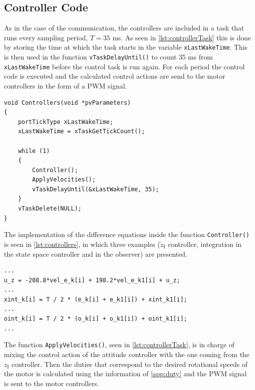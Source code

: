 \subsection{Controller Code}
As in the case of the communication, the controllers are included in a task that runs every sampling period, $T = 35$ \si{ms}. As seen in \autoref{lst:controllerTask} this is done by storing the time at which the task starts in the variable \lstinline[style=customcppinline]{xLastWakeTime}. This is then used in the function \lstinline[style=customcppinline]{vTaskDelayUntil()} to count 35 ms from \lstinline[style=customcppinline]{xLastWakeTime} before the control task is run again. For each period the control code is executed and the calculated control actions are send to the motor controllers in the form of a PWM signal.



\begin{lstlisting}[style=customcpp,
caption={Code for the controller task.}, 
label=lst:controllerTask]
void Controllers(void *pvParameters)
{
	portTickType xLastWakeTime;
	xLastWakeTime = xTaskGetTickCount();
	
	while (1)
	{
		Controller();
		ApplyVelocities();
		vTaskDelayUntil(&xLastWakeTime, 35);
	}
	vTaskDelete(NULL);
}
\end{lstlisting}

The implementation of the difference equations inside the function \lstinline[style=customcppinline]{Controller()} is seen in \autoref{lst:controllers}, in which three examples ($\dot{z}_{\mathrm{I}}$ controller, integration in the state space controller and in the observer) are presented.

\begin{lstlisting}[style=customcpp,
caption={Code for the controllers.}, 
label=lst:controllers]
...
u_z = -208.8*vel_e_k[i] + 198.2*vel_e_k1[i] + u_z;
...
xint_k[i] = T / 2 * (e_k[i] + e_k1[i]) + xint_k1[i];
...
oint_k[i] = T / 2 * (o_k[i] + o_k1[i]) + oint_k1[i];
...

\end{lstlisting}

The function \lstinline[style=customcppinline]{ApplyVelocities()}, seen in \autoref{lst:controllerTask}, is in charge of mixing the control action of the attitude controller with the one coming from the $z_{\mathrm{I}}$ controller. Then the duties that correspond to the desired rotational speeds of the motor is calculated using the information of \autoref{app:duty} and the PWM signal is sent to the motor controllers.











